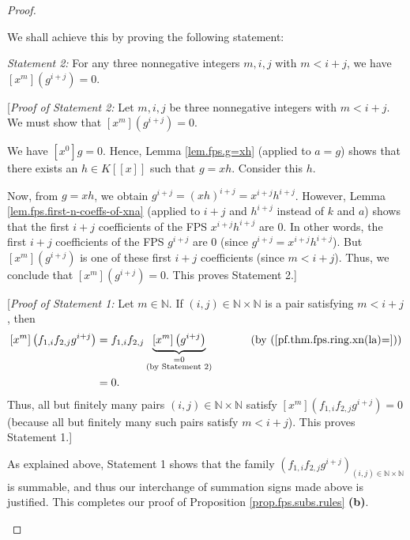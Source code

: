 \begin{proof}
\begin{fineprint}
We shall achieve this by proving the following statement:

\begin{statement}
\textit{Statement 2:} For any three nonnegative integers $m,i,j$ with $m<i+j$,
we have $\left[  x^{m}\right]  \left(  g^{i+j}\right)  =0$.
\end{statement}

[\textit{Proof of Statement 2:} Let $m,i,j$ be three nonnegative integers with
$m<i+j$. We must show that $\left[  x^{m}\right]  \left(  g^{i+j}\right)  =0$.

We have $\left[  x^{0}\right]  g=0$. Hence, Lemma \ref{lem.fps.g=xh} (applied
to $a=g$) shows that there exists an $h\in K\left[  \left[  x\right]  \right]
$ such that $g=xh$. Consider this $h$.

Now, from $g=xh$, we obtain $g^{i+j}=\left(  xh\right)  ^{i+j}=x^{i+j}h^{i+j}%
$. However, Lemma \ref{lem.fps.first-n-coeffs-of-xna} (applied to $i+j$ and
$h^{i+j}$ instead of $k$ and $a$) shows that the first $i+j$ coefficients of
the FPS $x^{i+j}h^{i+j}$ are $0$. In other words, the first $i+j$ coefficients
of the FPS $g^{i+j}$ are $0$ (since $g^{i+j}=x^{i+j}h^{i+j}$). But $\left[
x^{m}\right]  \left(  g^{i+j}\right)  $ is one of these first $i+j$
coefficients (since $m<i+j$). Thus, we conclude that $\left[  x^{m}\right]
\left(  g^{i+j}\right)  =0$. This proves Statement 2.]

[\textit{Proof of Statement 1:} Let $m\in\mathbb{N}$. If $\left(  i,j\right)
\in\mathbb{N}\times\mathbb{N}$ is a pair satisfying $m<i+j$, then%
\begin{align*}
\left[  x^{m}\right]  \left(  f_{1,i}f_{2,j}g^{i+j}\right)   &  =f_{1,i}%
f_{2,j}\underbrace{\left[  x^{m}\right]  \left(  g^{i+j}\right)
}_{\substack{=0\\\text{(by Statement 2)}}}\ \ \ \ \ \ \ \ \ \ \left(  \text{by
(\ref{pf.thm.fps.ring.xn(la)=})}\right) \\
&  =0.
\end{align*}
Thus, all but finitely many pairs $\left(  i,j\right)  \in\mathbb{N}%
\times\mathbb{N}$ satisfy $\left[  x^{m}\right]  \left(  f_{1,i}f_{2,j}%
g^{i+j}\right)  =0$ (because all but finitely many such pairs satisfy
$m<i+j$). This proves Statement 1.]

As explained above, Statement 1 shows that the family \newline$\left(
f_{1,i}f_{2,j}g^{i+j}\right)  _{\left(  i,j\right)  \in\mathbb{N}%
\times\mathbb{N}}$ is summable, and thus our interchange of summation signs
made above is justified. This completes our proof of Proposition
\ref{prop.fps.subs.rules} \textbf{(b)}.
\end{fineprint}


\end{proof}
